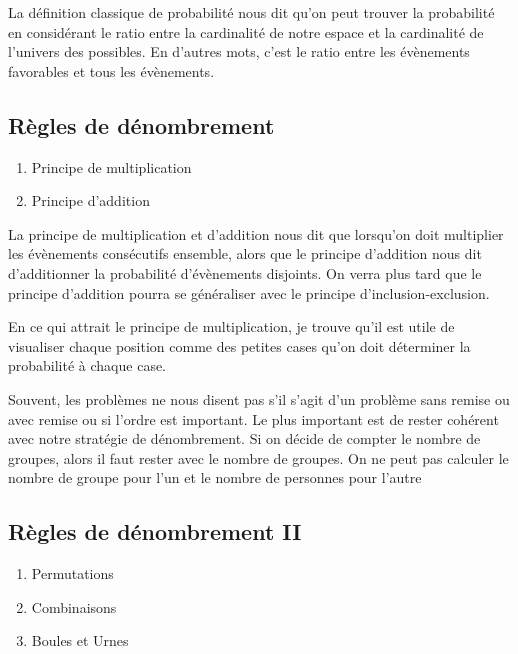 \documentclass{article}
\begin{document}
La définition classique de probabilité nous dit qu'on peut trouver la
probabilité en considérant le ratio entre la cardinalité de notre
espace et la cardinalité de l'univers des possibles. En d'autres mots,
c'est le ratio entre les évènements favorables et tous les évènements.

\subsection{Règles de dénombrement}

\begin{enumerate}
    \item Principe de multiplication
    \item Principe d'addition
\end{enumerate}

La principe de multiplication et d'addition nous dit que lorsqu'on doit
multiplier les évènements consécutifs ensemble, alors que le principe
d'addition nous dit d'additionner la probabilité d'évènements disjoints.
On verra plus tard que le principe d'addition pourra se généraliser avec
le principe d'inclusion-exclusion.

En ce qui attrait le principe de multiplication, je trouve qu'il est
utile de visualiser chaque position comme des petites cases qu'on
doit déterminer la probabilité à chaque case.

\begin{problem}
    Souvent, les problèmes ne nous disent pas s'il s'agit d'un
    problème sans remise ou avec remise ou si l'ordre est important.
    Le plus important est de rester cohérent avec notre stratégie de
    dénombrement. Si on décide de compter le nombre de groupes, alors
    il faut rester avec le nombre de groupes. On ne peut pas calculer
    le nombre de groupe pour l'un et le nombre de personnes pour l'autre
\end{problem}

\subsection{Règles de dénombrement II}

\begin{enumerate}
    \item Permutations
    \item Combinaisons
    \item Boules et Urnes
\end{enumerate}
\end{document}
